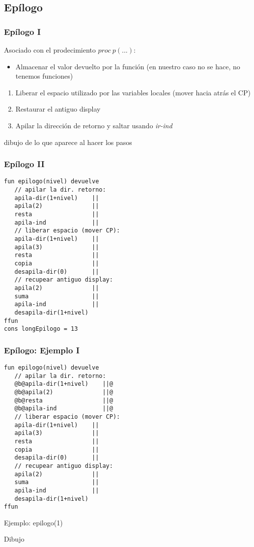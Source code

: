 \documentclass[hyperref={pdfpagelabels=false},tree-dvips]{beamer}
\begin{document}
\subsection{Epílogo}
\begin{frame}[fragile]
\frametitle{Epílogo I}

Asociado con el prodecimiento $proc \ p(...)$:
\begin{itemize}[<+->]
    \item Almacenar el valor devuelto por la función (en nuestro caso no se hace, no tenemos funciones)
\end{itemize}
\begin{enumerate}[<+->]
    \item Liberar el espacio utilizado por las variables locales (mover hacia atrás el CP)
    \item Restaurar el antiguo display
    \item Apilar la dirección de retorno y saltar usando \emph{ir-ind}
\end{enumerate}

dibujo de lo que aparece al hacer los pasos

\end{frame}
\begin{frame}[fragile]
\frametitle{Epílogo II}
\begin{lstlisting}[style=codigoMP,basicstyle=\scriptsize\ttfamily]
fun epilogo(nivel) devuelve
   // apilar la dir. retorno:
   apila-dir(1+nivel)    ||
   apila(2)              ||
   resta                 ||
   apila-ind             ||
   // liberar espacio (mover CP):
   apila-dir(1+nivel)    ||
   apila(3)              ||
   resta                 ||
   copia                 ||
   desapila-dir(0)       ||
   // recupear antiguo display:
   apila(2)              ||
   suma                  ||
   apila-ind             ||
   desapila-dir(1+nivel)
ffun
cons longEpilogo = 13
\end{lstlisting}

\end{frame}
\begin{frame}[fragile]
\frametitle{Epílogo: Ejemplo I}

\begin{lstlisting}[style=codigoMP,basicstyle=\tiny\ttfamily]
fun epilogo(nivel) devuelve
   // apilar la dir. retorno:
   @b@apila-dir(1+nivel)    ||@
   @b@apila(2)              ||@
   @b@resta                 ||@
   @b@apila-ind             ||@
   // liberar espacio (mover CP):
   apila-dir(1+nivel)    ||
   apila(3)              ||
   resta                 ||
   copia                 ||
   desapila-dir(0)       ||
   // recupear antiguo display:
   apila(2)              ||
   suma                  ||
   apila-ind             ||
   desapila-dir(1+nivel)
ffun
\end{lstlisting}

Ejemplo: epilogo(1)

Dibujo

\end{frame}
\end{document}
